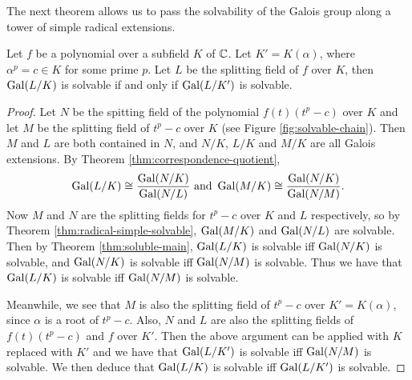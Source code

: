 The next theorem allows us to pass the solvability of the Galois group along a tower of simple radical extensions. 

%		

\begin{theorem} \label{thm:solvable:chain}
	Let $f$ be a polynomial over a subfield $K$ of $\mathbb C$. Let $K' = K(\alpha)$, where $\alpha^p = c \in K$ for some prime $p$. Let $L$ be the splitting field of $f$ over $K$, then $\operatorname{Gal}(L/K)$ is solvable if and only if $\operatorname{Gal}(L / K')$ is solvable. 
\end{theorem}



\begin{proof}
	Let $N$ be the spitting field of the polynomial $f(t)(t^p - c)$ over $K$ and let $M$ be the splitting field of $t^p -c $ over $K$ (see Figure \ref{fig:solvable-chain}). Then $M$ and $L$ are both contained in $N$, and $N/K$, $L/K$ and $M/K$ are all Galois extensions. By Theorem \ref{thm:correspondence-quotient}, 
	$$ \operatorname{Gal}(L / K) \cong \frac{\operatorname{Gal}(N / K)}{\operatorname{Gal}(N / L)} \text{ and } \operatorname{Gal}(M / K) \cong \frac{\operatorname{Gal}(N / K)}{\operatorname{Gal}(N / M)}.$$
	Now $M$ and $N$ are the splitting fields for $t^p - c$ over $K$ and $L$ respectively, so by Theorem \ref{thm:radical-simple-solvable}, $\operatorname{Gal}(M/K)$ and $\operatorname{Gal}(N / L)$ are solvable. Then by Theorem \ref{thm:soluble-main}, $\operatorname{Gal}(L/K)$ is solvable iff $\operatorname{Gal}(N/K)$ is solvable, and $\operatorname{Gal}(N / K)$ is solvable iff $\operatorname{Gal}(N/M)$ is solvable. Thus we have that $\operatorname{Gal}(L/K)$ is solvable iff $\operatorname{Gal}(N/M)$ is solvable. 
	
	Meanwhile, we see that $M$ is also the splitting field of $t^p - c$ over $K' = K(\alpha)$, since $\alpha$ is a root of $t^p - c$. Also, $N$ and $L$ are also the splitting fields of $f(t) (t^p - c)$ and $f$ over $K'$. Then the above argument can be applied with $K$ replaced with $K'$ and we have that $\operatorname{Gal}(L/K')$ is solvable iff $\operatorname{Gal}(N/M)$ is solvable. We then deduce that $\operatorname{Gal}(L/K)$ is solvable iff $\operatorname{Gal}(L/K')$ is solvable. 
\end{proof}

